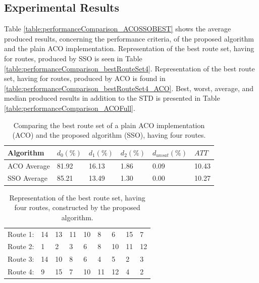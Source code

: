 \subsection{Experimental Results}
\label{subsec:performanceComparison_results}


Table \vref{table:performanceComparison_ACOSSOBEST} shows the average produced results, concerning the performance criteria, of the proposed algorithm and the plain ACO implementation. Representation of the best route set, having for routes, produced by SSO is seen in Table \vref{table:performanceComparison_bestRouteSet4}.  Representation of the best route set, having for routes, produced by ACO is found in \vref{table:performanceComparison_bestRouteSet4_ACO}. Best, worst, average, and median produced results in addition to the STD is presented in Table \vref{table:performanceComparison_ACOFull}.

    \begin{table}[H]
    \centering
    \begin{tabular}{|l||l|l|l|l|l|}
    \hline
    Algorithm & $d_0(\%)$ & $d_1(\%)$ & $d_2(\%)$ & $d_{unsat}(\%)$ & $ATT$ \\
    \hline
    ACO Average & 81.92 & 16.13 & 1.86 & 0.09 & 10.43\\
    \hline
    SSO Average & 85.21 & 13.49 & 1.30 & 0.00 & 10.27\\
    \hline
    \end{tabular}
    \caption {Comparing the best route set of a plain ACO implementation (ACO) and the proposed algorithm (SSO), having four routes.}
    \label{table:performanceComparison_ACOSSOBEST}
    \end{table}

   


\begin{table}[H]
    \centering
    \begin{tabular}{|l|llllllll|}
    \hline
    Route 1: & 14 & 13 & 11 & 10 & 8 & 6 & 15 & 7 \\
    Route 2: & 1 & 2 & 3 & 6 & 8 & 10 & 11 & 12 \\
    Route 3: & 14 & 10 & 8 & 6 & 4 & 5 & 2 & 3 \\
    Route 4: & 9 & 15 & 7 & 10 & 11 & 12 & 4 & 2 \\
	\hline
    \end{tabular}
    \caption {Representation of the best route set, having four routes, constructed by the proposed algorithm.}
    \label{table:performanceComparison_bestRouteSet4}
\end{table}

